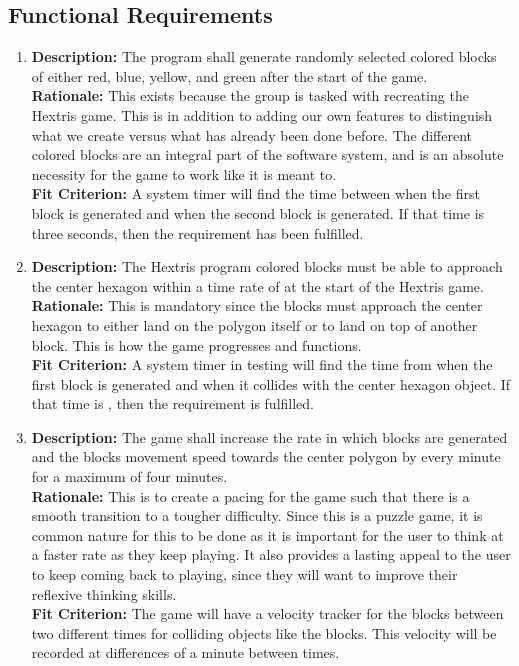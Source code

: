 \documentclass[12pt, titlepage]{article}
\begin{document}
\subsection{Functional Requirements}
\begin{enumerate}[label=F\arabic*]
\item \textbf{Description:} The program shall generate randomly selected colored blocks of either red, blue, yellow, and green after the start of the game.\\
\textbf{Rationale:} This exists because the group is tasked with recreating the Hextris game. This is in addition to adding our own features to distinguish what we create versus what has already been done before. The different colored blocks are an integral part of the software system, and is an absolute necessity for the game to work like it is meant to. \\
\textbf{Fit Criterion:} A system timer will find the time between when the first block is generated and when the second block is generated. If that time is three seconds, then the requirement has been fulfilled. 

\item \textbf{Description:} The Hextris program colored blocks must be able to approach the center hexagon within a time rate of \textdelta \space at the start of the Hextris game.\\
\textbf{Rationale:} This is mandatory since the blocks must approach the center hexagon to either land on the polygon itself or to land on top of another block. This is how the game progresses and functions. \\
\textbf{Fit Criterion:} A system timer in testing will find the time from when the first block is generated and when it collides with the center hexagon object. If that time is \textdelta, then the requirement is fulfilled. 

\item \textbf{Description:} The game shall increase the rate in which blocks are generated and the blocks movement speed towards the center polygon by \textalpha \space every minute for a maximum of four minutes.\\
\textbf{Rationale:} This is to create a pacing for the game such that there is a smooth transition to a tougher difficulty. Since this is a puzzle game, it is common nature for this to be done as it is important for the user to think at a faster rate as they keep playing. It also provides a lasting appeal to the user to keep coming back to playing, since they will want to improve their reflexive thinking skills.\\
\textbf{Fit Criterion:} The game will have a velocity tracker for the blocks between two different times for colliding objects like the blocks. This velocity will be recorded at differences of a minute between times. 


\end{enumerate}
\end{document}
